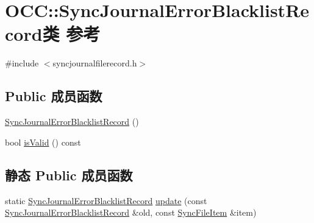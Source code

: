 \hypertarget{class_o_c_c_1_1_sync_journal_error_blacklist_record}{}\section{O\+CC\+:\+:Sync\+Journal\+Error\+Blacklist\+Record类 参考}
\label{class_o_c_c_1_1_sync_journal_error_blacklist_record}


{\ttfamily \#include $<$syncjournalfilerecord.\+h$>$}

\subsection*{Public 成员函数}
\begin{DoxyCompactItemize}
\item 
\hyperlink{class_o_c_c_1_1_sync_journal_error_blacklist_record_a2cdec0cfcf39b04e1739c2d63657ae79}{Sync\+Journal\+Error\+Blacklist\+Record} ()
\item 
bool \hyperlink{class_o_c_c_1_1_sync_journal_error_blacklist_record_a771f41d638691f846ddbd58e86348f82}{is\+Valid} () const
\end{DoxyCompactItemize}
\subsection*{静态 Public 成员函数}
\begin{DoxyCompactItemize}
\item 
static \hyperlink{class_o_c_c_1_1_sync_journal_error_blacklist_record}{Sync\+Journal\+Error\+Blacklist\+Record} \hyperlink{class_o_c_c_1_1_sync_journal_error_blacklist_record_ad0ec0283db421504beae92457a65b9af}{update} (const \hyperlink{class_o_c_c_1_1_sync_journal_error_blacklist_record}{Sync\+Journal\+Error\+Blacklist\+Record} \&old, const \hyperlink{class_o_c_c_1_1_sync_file_item}{Sync\+File\+Item} \&item)
\end{DoxyCompactItemize}
